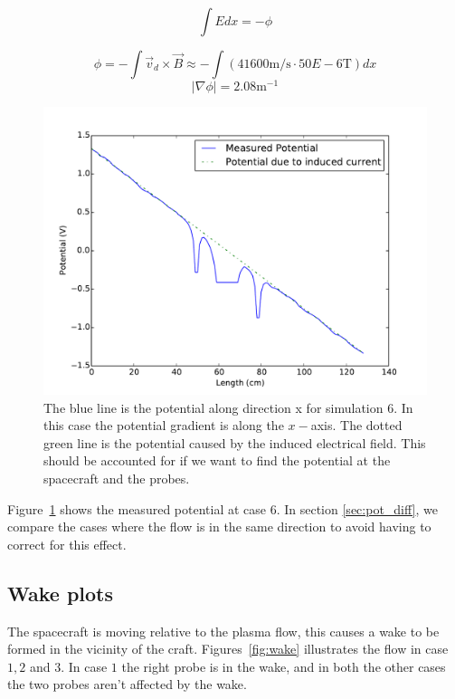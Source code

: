 	\begin{equation}
		\int{Edx} = -\phi
	\end{equation}

	\begin{equation}
		\phi = -\int \vec{v}_d\times\vec{B} \approx -\int \left( 41600 \text{m/s}\cdot 50E-6 \text{T} \right) dx
	\end{equation}
	\begin{equation}
		|\nabla\phi| = 2.08 \text{m}^{-1}
	\end{equation}

	\begin{figure}
		\includegraphics[width = \textwidth]{images/emph}
		\caption{The blue line is the potential along direction x for simulation \(6\). In this case the potential gradient is along
		the \(x-\)axis. The dotted green line is the potential caused by the induced electrical field. This should be accounted for
		if  we want to find the potential at the spacecraft and the probes.}
		\label{fig:emph}
	\end{figure}

	Figure~\ref{fig:emph} shows the measured potential at case \(6\). In section \ref{sec:pot_diff},  we compare
	the cases where the flow is in the same direction to avoid having to correct for this effect.

	\subsection{Wake plots}
		The spacecraft is moving relative to the plasma flow, this causes a wake to be formed in the vicinity of the craft.
	 	Figures~\ref{fig:wake} illustrates the flow in case \(1,2\) and \(3\). In case \(1\) the right probe is in the wake,
		and in both the other cases the two probes aren't affected by the wake.


